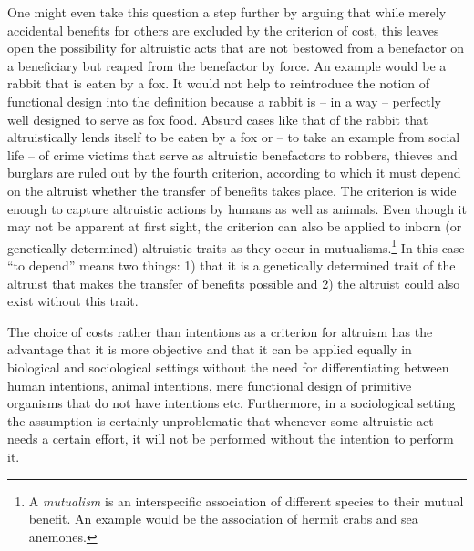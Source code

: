 One might even take this question a step further by arguing that while merely
accidental benefits for others are excluded by the criterion of cost, this
leaves open the possibility for altruistic acts that are not bestowed from a
benefactor on a beneficiary but reaped from the benefactor by force. An
example would be a rabbit that is eaten by a fox. It would not help to
reintroduce the notion of functional design into the definition because a
rabbit is -- in a way -- perfectly well designed to serve as fox food.  Absurd
cases like that of the rabbit that altruistically lends itself to be eaten by
a fox or -- to take an example from social life -- of crime victims that serve
as altruistic benefactors to robbers, thieves and burglars are ruled out by
the fourth criterion, according to which it must depend on the altruist
whether the transfer of benefits takes place.  The criterion is wide enough to
capture altruistic actions by humans as well as animals.  Even though it may
not be apparent at first sight, the criterion can also be applied to inborn
(or genetically determined) altruistic traits as they occur in
mutualisms.\footnote{A {\em mutualism} is an interspecific association of
  different species to their mutual benefit.  An example would be the
  association of hermit crabs and sea anemones.} In this case ``to depend''
means two things: 1) that it is a genetically determined trait of the altruist
that makes the transfer of benefits possible and 2) the altruist could also
exist without this trait.

The choice of costs rather than intentions as a criterion for altruism has the
advantage that it is more objective and that it can be applied equally in
biological and sociological settings without the need for differentiating
between human intentions, animal intentions, mere functional design of
primitive organisms that do not have intentions etc. Furthermore, in a
sociological setting the assumption is certainly
unproblematic that whenever some altruistic act needs a certain effort, it
will not be performed without the intention to perform it.

